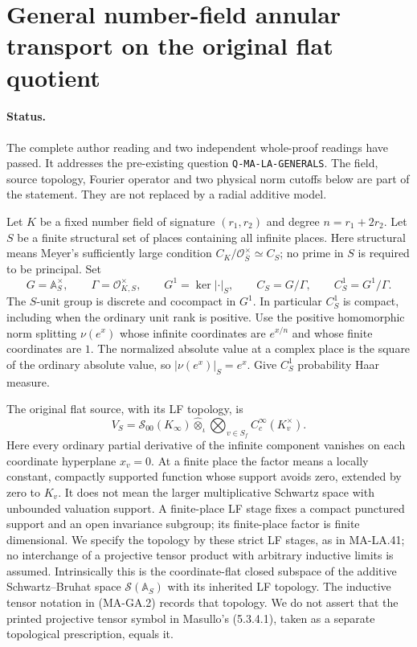 \section{General number-field annular transport on the original flat quotient}
\label{sec:general-annular-transport}

\paragraph{Status.}
The complete author reading and two independent
whole-proof readings have passed.  It addresses the pre-existing question
\texttt{Q-MA-LA-GENERALS}.  The field, source topology, Fourier
operator and two physical norm cutoffs below are part of the statement.
They are not replaced by a radial additive model.

Let $K$ be a fixed number field of signature $(r_1,r_2)$ and degree
$n=r_1+2r_2$.  Let $S$ be a finite structural set of places containing
all infinite places.  Here structural means Meyer's sufficiently
large condition
$C_K/\mathcal O_{\overline S}^{\times}\simeq C_S$; no prime in $S$
is required to be principal.  Set
\[
 G=\mathbb A_S^\times,\qquad
 \Gamma=\mathcal O_{K,S}^\times,\qquad
 G^1=\ker|\cdot|_S,\qquad C_S=G/\Gamma,
 \qquad C_S^1=G^1/\Gamma.
 \tag{MA-GA.1}
\]
The $S$-unit group is discrete and cocompact in $G^1$.
In particular $C_S^1$ is compact, including when the ordinary
unit rank is positive.  Use the positive homomorphic norm splitting
$\nu(e^x)$ whose infinite coordinates are $e^{x/n}$ and whose
finite coordinates are $1$.  The normalized absolute value at a
complex place is the square of the ordinary absolute value, so
$|\nu(e^x)|_S=e^x$.  Give $C_S^1$ probability Haar measure.

The original flat source, with its LF topology, is
\[
 V_S=\mathcal S_{00}(K_\infty)
       \mathbin{\widehat\otimes}_{\iota}
       \bigotimes_{v\in S_f}C_c^\infty(K_v^\times).
 \tag{MA-GA.2}
\]
Here every ordinary partial derivative of the infinite component
vanishes on each coordinate hyperplane $x_v=0$.  At a finite
place the factor means a locally constant, compactly supported
function whose support avoids zero, extended by zero to $K_v$.
It does not mean the larger multiplicative Schwartz space with
unbounded valuation support.  A finite-place LF stage fixes a
compact punctured support and an open invariance subgroup; its
finite-place factor is finite dimensional.  We specify
the topology by these strict LF stages, as in MA-LA.41;
no interchange of a projective tensor product with arbitrary
inductive limits is assumed.
Intrinsically this is the coordinate-flat closed subspace
of the additive Schwartz--Bruhat space
$\mathcal S(\mathbb A_S)$ with its inherited LF topology.
The inductive tensor notation in (MA-GA.2) records that
topology.  We do not assert that the printed projective
tensor symbol in Masullo's (5.3.4.1), taken as a separate
topological prescription, equals it.

